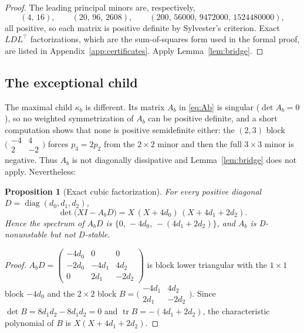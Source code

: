 \documentclass[11pt,a4paper]{article}
\newtheorem{proposition}[theorem]{Proposition}
\theoremstyle{definition}
\theoremstyle{remark}
\newcommand{\diag}{\operatorname{diag}}
\begin{document}
\begin{proof}
The leading principal minors are, respectively,
\[
(4,\,16),\qquad (20,\,96,\,2608),\qquad (200,\,56000,\,9472000,\,1524480000),
\]
all positive, so each matrix is positive definite by Sylvester's criterion. Exact $LDL^{\top}$ factorizations, which are the sum-of-squares form used in the formal proof, are listed in Appendix~\ref{app:certificates}. Apply Lemma~\ref{lem:bridge}.
\end{proof}

\subsection{The exceptional child}

The maximal child $\kappa_b$ is different. Its matrix $A_b$ in \eqref{eq:Ab} is singular ($\det A_b=0$), so no weighted symmetrization of $A_b$ can be positive definite, and a short computation shows that none is positive semidefinite either: the $(2,3)$ block $\bigl(\begin{smallmatrix}-4&4\\2&-2\end{smallmatrix}\bigr)$ forces $p_3=2p_2$ from the $2\times2$ minor and then the full $3\times3$ minor is negative. Thus $A_b$ is not diagonally dissipative and Lemma~\ref{lem:bridge} does not apply. Nevertheless:

\begin{proposition}[Exact cubic factorization]\label{prop:cubic}
For every positive diagonal $D=\diag(d_0,d_1,d_2)$,
\[
\det\bigl(XI-A_bD\bigr)=X\,(X+4d_0)\,(X+4d_1+2d_2).
\]
Hence the spectrum of $A_bD$ is $\{0,\,-4d_0,\,-(4d_1+2d_2)\}$, and $A_b$ is D-nonunstable but not D-stable.
\end{proposition}

\begin{proof}
$A_bD=\begin{pmatrix}-4d_0&0&0\\-2d_0&-4d_1&4d_2\\0&2d_1&-2d_2\end{pmatrix}$ is block lower triangular with the $1\times1$ block $-4d_0$ and the $2\times2$ block $B=\bigl(\begin{smallmatrix}-4d_1&4d_2\\2d_1&-2d_2\end{smallmatrix}\bigr)$. Since $\det B=8d_1d_2-8d_1d_2=0$ and $\operatorname{tr}B=-(4d_1+2d_2)$, the characteristic polynomial of $B$ is $X(X+4d_1+2d_2)$.
\end{proof}
\end{document}

